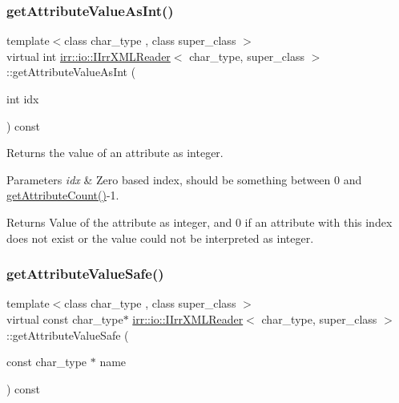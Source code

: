 \subsubsection{\texorpdfstring{get\+Attribute\+Value\+As\+Int()}{getAttributeValueAsInt()}\hspace{0.1cm}{\footnotesize\ttfamily [4/4]}}
{\footnotesize\ttfamily template$<$class char\+\_\+type , class super\+\_\+class $>$ \\
virtual int \hyperlink{classirr_1_1io_1_1IIrrXMLReader}{irr\+::io\+::\+I\+Irr\+X\+M\+L\+Reader}$<$ char\+\_\+type, super\+\_\+class $>$\+::get\+Attribute\+Value\+As\+Int (\begin{DoxyParamCaption}\item[{int}]{idx }\end{DoxyParamCaption}) const\hspace{0.3cm}{\ttfamily [pure virtual]}}



Returns the value of an attribute as integer. 


\begin{DoxyParams}{Parameters}
{\em idx} & Zero based index, should be something between 0 and \hyperlink{classirr_1_1io_1_1IIrrXMLReader_a8f85253d2efb15061facdb9571b9c549}{get\+Attribute\+Count()}-\/1. \\
\hline
\end{DoxyParams}
\begin{DoxyReturn}{Returns}
Value of the attribute as integer, and 0 if an attribute with this index does not exist or the value could not be interpreted as integer. 
\end{DoxyReturn}
\mbox{\label{classirr_1_1io_1_1IIrrXMLReader_a7674852b2e24b2710b90aab10ef1fc22}} 
\subsubsection{\texorpdfstring{get\+Attribute\+Value\+Safe()}{getAttributeValueSafe()}\hspace{0.1cm}{\footnotesize\ttfamily [1/2]}}
{\footnotesize\ttfamily template$<$class char\+\_\+type , class super\+\_\+class $>$ \\
virtual const char\+\_\+type$\ast$ \hyperlink{classirr_1_1io_1_1IIrrXMLReader}{irr\+::io\+::\+I\+Irr\+X\+M\+L\+Reader}$<$ char\+\_\+type, super\+\_\+class $>$\+::get\+Attribute\+Value\+Safe (\begin{DoxyParamCaption}\item[{const char\+\_\+type $\ast$}]{name }\end{DoxyParamCaption}) const\hspace{0.3cm}{\ttfamily [pure virtual]}}



